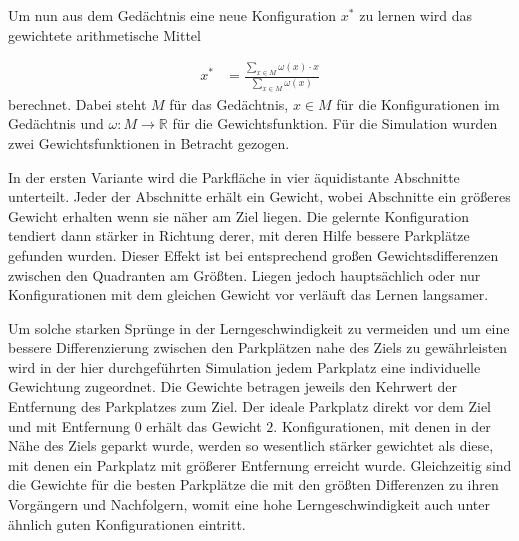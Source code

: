 Um nun aus dem Gedächtnis eine neue Konfiguration $x^*$ zu lernen wird das gewichtete arithmetische Mittel 

\begin{align}
	x^{*} &= \frac{\sum\limits_{x \in M} \omega (x) \cdot x}{\sum\limits_{x \in M} \omega (x)}\label{form_gelernterParameter}
\end{align}
 berechnet. Dabei steht $M$ für das Gedächtnis, $x\in M$ für die Konfigurationen im Gedächtnis und $\omega : M \rightarrow \mathbb{R}$ für die Gewichtsfunktion. Für die Simulation wurden zwei Gewichtsfunktionen in Betracht gezogen.

In der ersten Variante wird die Parkfläche in vier äquidistante Abschnitte unterteilt. Jeder der Abschnitte erhält ein Gewicht, wobei Abschnitte ein größeres Gewicht erhalten wenn sie näher am Ziel liegen. Die gelernte Konfiguration tendiert dann stärker in Richtung derer, mit deren Hilfe bessere Parkplätze gefunden wurden. Dieser Effekt ist bei entsprechend großen Gewichtsdifferenzen zwischen den Quadranten am Größten. Liegen jedoch hauptsächlich oder nur Konfigurationen mit dem gleichen Gewicht vor verläuft das Lernen langsamer. 

Um solche starken Sprünge in der Lerngeschwindigkeit zu vermeiden und um eine bessere Differenzierung zwischen den Parkplätzen nahe des Ziels zu gewährleisten wird in der hier durchgeführten Simulation jedem Parkplatz eine individuelle Gewichtung zugeordnet. Die Gewichte betragen jeweils den Kehrwert der Entfernung des Parkplatzes zum Ziel. Der ideale Parkplatz direkt vor dem Ziel und mit Entfernung $0$ erhält das Gewicht $2$. Konfigurationen, mit denen in der Nähe des Ziels geparkt wurde, werden so wesentlich stärker gewichtet als diese, mit denen ein Parkplatz mit größerer Entfernung erreicht wurde. Gleichzeitig sind die Gewichte für die besten Parkplätze die mit den größten Differenzen zu ihren Vorgängern und Nachfolgern, womit eine hohe Lerngeschwindigkeit auch unter ähnlich guten Konfigurationen eintritt. 
